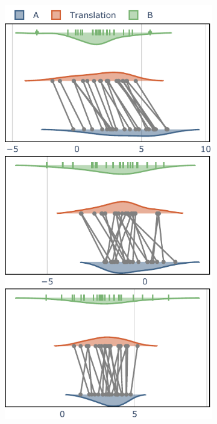 \documentclass[nohyperref]{article}
\theoremstyle{plain}
\theoremstyle{definition}
\theoremstyle{remark}
\begin{document}
\begin{figure}[t]
    \vskip 0.2in
    \begin{center}
\begin{subfigure}{0.49\columnwidth}
    \includegraphics[width=\textwidth]{files/trans_ours.pdf}

\end{subfigure}
\end{center}
\end{figure}
\end{document}
